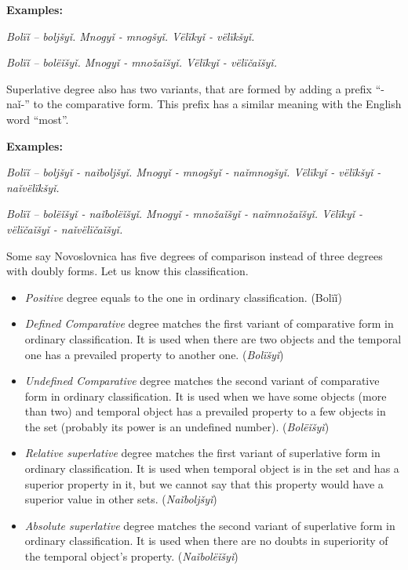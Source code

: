 \textbf{Examples:}

\textit{Bolïǐ – boljšyǐ. Mnogyǐ - mnogšyǐ. Vëlïkyǐ - vëlïkšyǐ.}

\textit{Bolïǐ – bolëǐšyǐ. Mnogyǐ - množaǐšyǐ. Vëlïkyǐ - vëlïčaǐšyǐ.}

Superlative degree also has two variants, that are formed by adding a prefix “-naǐ-” to the comparative form. This prefix has a similar meaning with the English word “most”.

\textbf{Examples:}

\textit{Bolïǐ – boljšyǐ - naǐboljšyǐ. Mnogyǐ - mnogšyǐ - naǐmnogšyǐ. Vëlïkyǐ - vëlïkšyǐ - naǐvëlïkšyǐ.}

\textit{Bolïǐ – bolëǐšyǐ - naǐbolëǐšyǐ. Mnogyǐ - množaǐšyǐ - naǐmnožaǐšyǐ. Vëlïkyǐ - vëlïčaǐšyǐ - naǐvëlïčaǐšyǐ.}

Some say Novoslovnica has five degrees of comparison instead of three degrees with doubly forms. Let us know this classification.

\begin{itemize}
	\item \textit{Positive} degree equals to the one in ordinary classification. (Bolïǐ)

	\item \textit{Defined Comparative} degree matches the first variant of comparative form in ordinary classification. It is used when there are two objects and the temporal one has a prevailed property to another one. (\textit{Bolïšyǐ})

	\item \textit{Undefined Comparative} degree matches the second variant of comparative form in ordinary classification. It is used when we have some objects (more than two) and temporal object has a prevailed property to a few objects in the set (probably its power is an undefined number). (\textit{Bolëǐšyǐ})

	\item \textit{Relative superlative} degree matches the first variant of superlative form in ordinary classification. It is used when temporal object is in the set and has a superior property in it, but we cannot say that this property would have a superior value in other sets. (\textit{Naǐboljšyǐ})

	\item \textit{Absolute superlative} degree matches the second variant of superlative form in ordinary classification. It is used when there are no doubts in superiority of the temporal object’s property. (\textit{Naǐbolëǐšyǐ})
\end{itemize}

